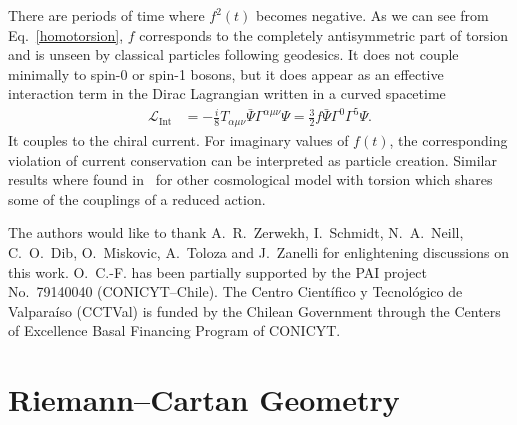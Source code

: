 \documentclass[aps,prd,12pt,superscriptaddress,showpacs,showkeys,longbibliography,reprint,nofootinbib]{revtex4-1}
\begin{document}

There are periods of time where $f^2(t)$ becomes negative. As we can see from Eq.~\eqref{homotorsion}, $f$ corresponds to the completely antisymmetric part of torsion and is unseen by classical particles following geodesics. It does not couple minimally to spin-0 or spin-1 bosons, but it does appear as an effective interaction term in the Dirac Lagrangian written in a curved spacetime~\cite{Hehl:1976kj}
\begin{align*}
  \mathcal{L}_{\text{Int}}&=-\frac{i}{8}T_{\alpha\mu\nu}\bar{\Psi}\Gamma^{\alpha\mu\nu}\Psi =\frac{3}{2}f\bar{\Psi}\Gamma^0\Gamma^5\Psi.
\end{align*}
It couples to the chiral current. For imaginary values of $f(t)$, the corresponding violation of current conservation can be interpreted as particle creation. Similar results where found in~\cite{Toloza:2013wi} for other cosmological model with torsion which shares some of the couplings of a reduced action.

\begin{acknowledgments}
  The authors would like to thank A.~R.~Zerwekh, I.~Schmidt, N.~A.~Neill, C.~O.~Dib, O.~Miskovic, A.~Toloza and J.~Zanelli for enlightening discussions on this work. \mbox{O.~C.-F.} has been partially supported by the PAI project No.~79140040 (CONICYT--Chile). The Centro Cient\'ifico y Tecnol\'ogico de Valpara\'iso (CCTVal) is funded by the Chilean Government through the Centers of Excellence Basal Financing Program of CONICYT.
\end{acknowledgments}


\appendix

\section{Riemann--Cartan Geometry\label{Riemann-Cartan}}
\end{document}
